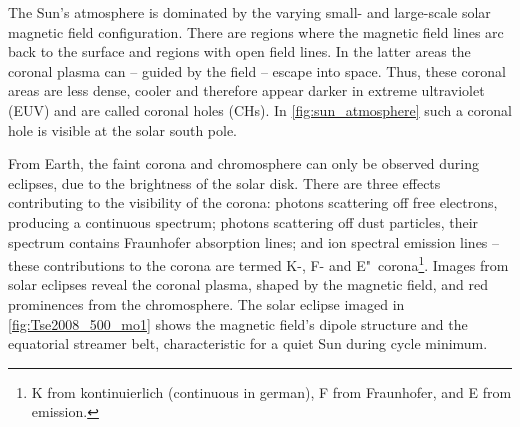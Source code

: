 The Sun's atmosphere is dominated by the varying small- and large-scale solar magnetic field configuration. There are regions where the magnetic field lines arc back to the surface and regions with open field lines. In the latter areas the coronal plasma can -- guided by the field -- escape into space. Thus, these coronal areas are less dense, cooler and therefore appear darker in extreme ultraviolet (EUV) and are called coronal holes (CHs). In \autoref{fig:sun_atmosphere} such a coronal hole is visible at the solar south pole.

From Earth, the faint corona and chromosphere can only be observed during eclipses, due to the brightness of the solar disk. There are three effects contributing to the visibility of the corona: photons scattering off free electrons, producing a continuous spectrum; photons scattering off dust particles, their spectrum contains Fraunhofer absorption lines; and ion spectral emission lines -- these contributions to the corona are termed K-, F- and E"~corona\footnote{K from kontinuierlich (continuous in german), F from Fraunhofer, and E from emission.}.
Images from solar eclipses reveal the coronal plasma, shaped by the magnetic field, and red prominences from the chromosphere. The solar eclipse imaged in \autoref{fig:Tse2008_500_mo1} shows the magnetic field's dipole structure and the equatorial streamer belt, characteristic for a quiet Sun during cycle minimum.
